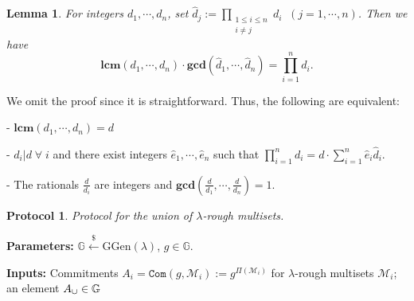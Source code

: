 \documentclass[11pt, lettersize, notitlepage, leqno, footskip=0.6cm]{article}
\newcommand{\pl}{\prod\limits}
\newcommand{\slim}{\sum\limits}
\newcommand{\ttt}{\texttt}
\newcommand{\mc}{\mathcal}
\newcommand{\mb}{\mathbb}
\newcommand{\mbf}{\mathbf}
\newcommand{\mr}{\mathrm}
\newcommand{\lam}{\lambda}
\newcommand{\lamb}{\lambda}
\newcommand{\what}{\widehat}
\newcommand{\vs}{\vspace{-0.15cm}}
\newcommand{\noin}{\noindent}
\newcommand{\LCM}{\mbf{lcm}}
\newcommand{\GCD}{\mbf{gcd}}
\newtheorem{Lem}[Thm]{Lemma}
\newtheorem{Prot}[Thm]{Protocol}
\numberwithin{equation}{section}
\begin{document}
\begin{Lem} For integers $d_1,\cdots,d_n$, set $\what{d}_j:= \pl_{\substack{1\leq i\leq n \\ i\neq j}} d_i \;\;(j=1,\cdots,n)$. Then we have \vspace{-0.3cm} $$ \LCM(d_1,\cdots,d_n)\cdot \GCD(\what{d}_1,\cdots,\what{d}_n) = \pl_{i=1}^n d_i.$$ \end{Lem}

\noin We omit the proof since it is straightforward. Thus, the following are equivalent:\vspace{0.1cm}

\noin - $\LCM(d_1,\cdots,d_n) = d$

\noin - $d_i\big| d\;\forall\; i$ and there exist integers $\what{e}_1,\cdots,\what{e}_n$ such that $\pl_{i=1}^n d_i  =  d\cdot\slim_{i=1}^n \what{e}_i\what{d}_i.$

\noin - The rationals $\frac{d}{d_i}$ are integers and $\GCD(\frac{d}{d_1},\cdots,\frac{d}{d_n}) = 1 .$

\vspace{0.2cm}

\begin{comment}
Let $p$ be a prime and let $\mr{val}_p(N)$ denote the largest integer $x$ such that $p^x$ divides $N$. Write $k_i:= \mr{val}_p(d_i)$ for brevity. Then $\mr{val}_p(\pl_{i=1}^n d_i) = \slim_{i=1}^n k_i$ and $\mr{val}_p(\what{d}_j) = (\slim_{i=1}^n k_i)-k_i$. Hence, \vs $$\mr{val}_p(\GCD(\what{d}_1,\cdots,\what{d}_n)) = \min\big((\slim_{i=1}^n k_i)-k_i\big)_i = \slim_{i=1}^n k_i - \max(k_1,\cdots,k_n).$$ On the other hand, \vs $$\mr{val}_p(\LCM(d_1,\cdots,d_n)) = \max(k_1,\cdots,k_n).$$ Thus, \vs $$\mr{val}_p(\LCM(d_1,\cdots,d_n))+ \mr{val}_p(\GCD(\what{d}_1,\cdots,\what{d}_n)) = \mr{val}_p(\pl_{i=1}^n d_i),$$ which completes the proof. \end{comment}





\begin{Prot} Protocol for the union of $\lam$-rough multisets.\end{Prot} \vspace{-0.3cm}

\noin \textbf{Parameters:} $\mb{G}\xleftarrow{\$} \mr{GGen}(\lamb)$,\; $g\in \mb{G}$.

\noin \textbf{Inputs:} Commitments $A_i = \ttt{Com}(g, \mc{M}_i) := g^{\Pi(\mc{M}_i)}$ for $\lam$-rough multisets $\mc{M}_i$; an element $A_{\tt{\cup}}\in\mb{G}$\vs
\end{document}
